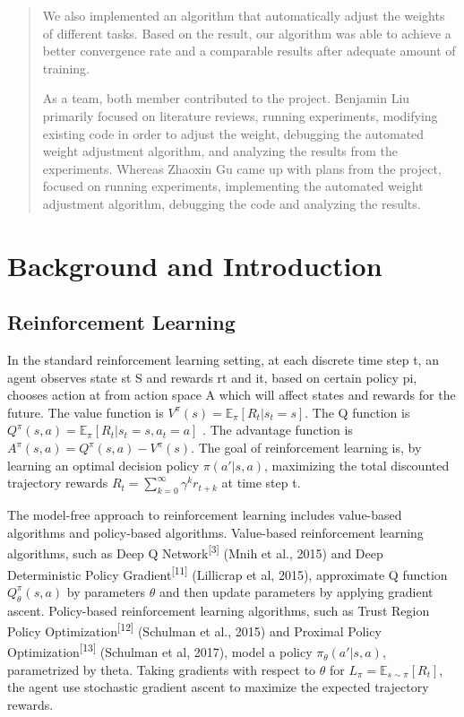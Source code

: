 \documentclass[12pt,twocolumn,letterpaper]{article}
\begin{document}
\begin{abstract}
We also implemented an algorithm that automatically adjust the weights of different tasks. Based on the result, our algorithm was able to achieve a better convergence rate and a comparable results after adequate amount of training.

As a team, both member contributed to the project. Benjamin Liu primarily focused on literature reviews, running experiments, modifying existing code in order to adjust the weight, debugging the automated weight adjustment algorithm, and analyzing the results from the experiments. Whereas Zhaoxin Gu came up with plans from the project, focused on running experiments, implementing the automated weight adjustment algorithm, debugging the code and analyzing the results.

\end{abstract}

\section{Background and Introduction}

\subsection{Reinforcement Learning}

In the standard reinforcement learning setting, at each discrete time step t, an agent observes state st S and rewards rt and it, based on certain policy pi, chooses action at from action space A which will affect states and rewards for the future. The value function is $V^{\pi}(s) = \mathbb{E}_\pi[R_{t}|s_t = s]$. The Q function is $Q^{\pi}(s, a) = \mathbb{E}_\pi[R_t|s_t = s, a_t = a]$ . The advantage function is $A^{\pi}(s, a) = Q^{\pi}(s, a) - V^{\pi}(s)$. The goal of reinforcement learning is, by learning an optimal decision policy $\pi(a'|s, a)$, maximizing the total discounted trajectory rewards $R_t = \sum_{k=0}^{\infty}\gamma^k r_{t+k}$ at time step t.

The model-free approach to reinforcement learning includes value-based algorithms and policy-based algorithms. Value-based reinforcement learning algorithms, such as Deep Q Network\textsuperscript{[3]} (Mnih et al., 2015) and Deep Deterministic Policy Gradient\textsuperscript{[11]} (Lillicrap et al, 2015), approximate Q function $Q_\theta^\pi(s, a)$ by parameters $\theta$ and then update parameters by applying gradient ascent. Policy-based reinforcement learning algorithms, such as Trust Region Policy Optimization\textsuperscript{[12]} (Schulman et al., 2015) and Proximal Policy Optimization\textsuperscript{[13]} (Schulman et al, 2017), model a policy $\pi_\theta(a'|s, a)$, parametrized by theta. Taking gradients with respect to $\theta$ for $L_\pi = \mathbb{E}_{s\sim\pi}[R_t]$, the agent use stochastic gradient ascent to maximize the expected trajectory rewards.
\end{document}
